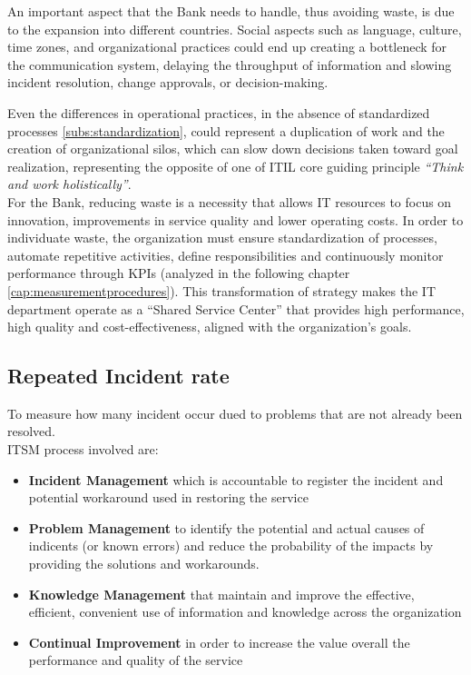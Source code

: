 An important aspect that the Bank needs to handle, thus avoiding waste, is due to the expansion into different countries. Social aspects such as language, culture, time zones, and organizational practices could end up creating a bottleneck for the communication system, delaying the throughput of information and slowing incident resolution, change approvals, or decision-making.


Even the differences in operational practices, in the absence of standardized processes \ref{subs:standardization}, could represent a duplication of work and the creation of organizational silos, which can slow down decisions taken toward goal realization, representing the opposite of one of ITIL core guiding principle \textit{``Think and work holistically''}. \\
For the Bank, reducing waste is a necessity that allows IT resources to focus on innovation, improvements in service quality and lower operating costs. In order to individuate waste, the organization must ensure standardization of processes, automate repetitive activities, define responsibilities and continuously monitor performance through KPIs (analyzed in the following chapter \ref{cap:measurementprocedures}). This transformation of strategy makes the IT department operate as a ``Shared Service Center'' that provides high performance, high quality and cost-effectiveness, aligned with the organization's goals.

\subsection{Repeated Incident rate}

    To measure how many incident occur dued to problems that are not already been resolved.\\
    ITSM process involved are:

    \begin{itemize}
        \item \textbf{Incident Management} which is accountable to register the incident and potential workaround used in restoring the service
        \item \textbf{Problem Management} to identify the potential and actual causes of indicents (or known errors) and reduce the probability of the impacts by providing the solutions and workarounds.
        \item \textbf{Knowledge Management} that maintain and improve the eﬀective, efficient, convenient use of information and knowledge across the organization
        \item \textbf{Continual Improvement} in order to increase the value overall the performance and quality of the service
    \end{itemize}

